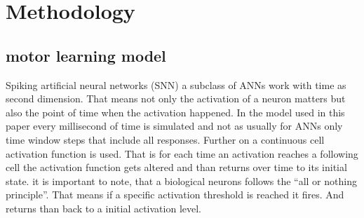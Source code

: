 \chapter{Methodology}\label{Methodology}
\section{motor learning model}
 Spiking artificial neural networks (SNN) a subclass of ANNs work with time as second dimension. That means not only the activation of a neuron matters but also the point of time when the activation happened. In the model used in this paper every millisecond of time is simulated and not as usually for ANNs only time window steps that include all responses. Further on a continuous cell activation function is used. That is for each time an activation reaches a following cell the activation function gets altered and than returns over time to its initial state.
 it is important to note, that a biological neurons follows the ``all or nothing principle''. That means if a specific activation threshold is reached it fires. And returns than back to a initial activation level.


